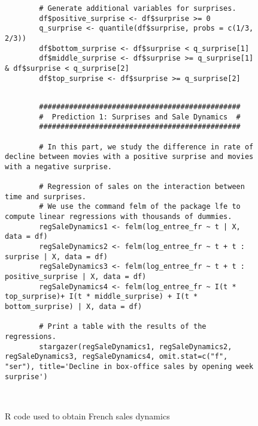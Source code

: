 \begin{appendices}
\begin{figure}[H]
\begin{lstlisting}
		# Generate additional variables for surprises.
		df$positive_surprise <- df$surprise >= 0
		q_surprise <- quantile(df$surprise, probs = c(1/3, 2/3))
		df$bottom_surprise <- df$surprise < q_surprise[1]
		df$middle_surprise <- df$surprise >= q_surprise[1] & df$surprise < q_surprise[2]
		df$top_surprise <- df$surprise >= q_surprise[2]
		
		\end{lstlisting}
	\end{figure}
	
	\begin{figure}[H]
		\caption{R code used to obtain French sales dynamics}
		\label{code_}
		\begin{lstlisting}
		###############################################
		#  Prediction 1: Surprises and Sale Dynamics  #
		###############################################
		
		# In this part, we study the difference in rate of decline between movies with a positive surprise and movies with a negative surprise.
		
		# Regression of sales on the interaction between time and surprises.
		# We use the command felm of the package lfe to compute linear regressions with thousands of dummies.
		regSaleDynamics1 <- felm(log_entree_fr ~ t | X, data = df)
		regSaleDynamics2 <- felm(log_entree_fr ~ t + t : surprise | X, data = df)
		regSaleDynamics3 <- felm(log_entree_fr ~ t + t : positive_surprise | X, data = df)
		regSaleDynamics4 <- felm(log_entree_fr ~ I(t * top_surprise)+ I(t * middle_surprise) + I(t * bottom_surprise) | X, data = df)
		
		# Print a table with the results of the regressions.
		stargazer(regSaleDynamics1, regSaleDynamics2, regSaleDynamics3, regSaleDynamics4, omit.stat=c("f", "ser"), title='Decline in box-office sales by opening week surprise')
		
		
		\end{lstlisting}
		
		
	\end{figure}
	
\end{appendices}
